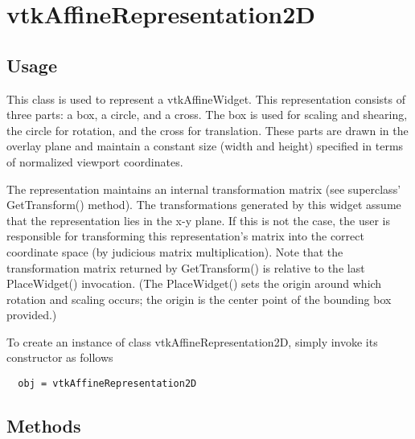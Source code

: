 \section{vtkAffineRepresentation2D}

\subsection{Usage}

 This class is used to represent a vtkAffineWidget. This representation
 consists of three parts: a box, a circle, and a cross. The box is used for
 scaling and shearing, the circle for rotation, and the cross for
 translation. These parts are drawn in the overlay plane and maintain a
 constant size (width and height) specified in terms of normalized viewport
 coordinates. 

 The representation maintains an internal transformation matrix (see
 superclass' GetTransform() method). The transformations generated by this
 widget assume that the representation lies in the x-y plane. If this is
 not the case, the user is responsible for transforming this
 representation's matrix into the correct coordinate space (by judicious
 matrix multiplication). Note that the transformation matrix returned by
 GetTransform() is relative to the last PlaceWidget() invocation. (The
 PlaceWidget() sets the origin around which rotation and scaling occurs;
 the origin is the center point of the bounding box provided.)


To create an instance of class vtkAffineRepresentation2D, simply
invoke its constructor as follows
\begin{verbatim}
  obj = vtkAffineRepresentation2D
\end{verbatim}
\subsection{Methods}

